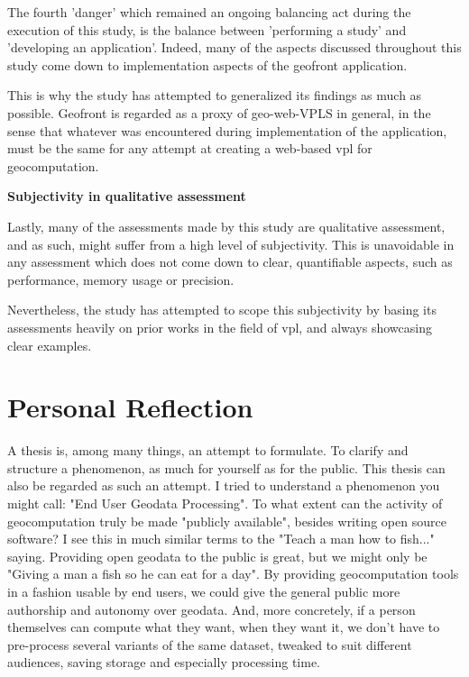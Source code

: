 The fourth 'danger' which remained an ongoing balancing act during the execution of this study, is the balance between 'performing a study' and 'developing an application'. 
Indeed, many of the aspects discussed throughout this study come down to implementation aspects of the geofront application. 

This is why the study has attempted to generalized its findings as much as possible.
Geofront is regarded as a proxy of geo-web-VPLS in general, in the sense that whatever was encountered during implementation of the application, must be the same for any attempt at creating a web-based vpl for geocomputation.


\textbf{Subjectivity in qualitative assessment}

Lastly, many of the assessments made by this study are qualitative assessment, and as such, might suffer from a high level of subjectivity. 
This is unavoidable in any assessment which does not come down to clear, quantifiable aspects, such as performance, memory usage or precision. 

Nevertheless, the study has attempted to scope this subjectivity by basing its assessments heavily on prior works in the field of vpl, and always showcasing clear examples. 

\newpage

\section{Personal Reflection}
\label{sec:personal-reflection}

A thesis is, among many things, an attempt to formulate. 
To clarify and structure a phenomenon, as much for yourself as for the public. 
This thesis can also be regarded as such an attempt. 
I tried to understand a phenomenon you might call: "End User Geodata Processing". 
To what extent can the activity of geocomputation truly be made "publicly available", besides writing open source software?
I see this in much similar terms to the "Teach a man how to fish..." saying.
Providing open geodata to the public is great, but we might only be "Giving a man a fish so he can eat for a day".
By providing geocomputation tools in a fashion usable by end users, we could give the general public more authorship and autonomy over geodata. 
And, more concretely, if a person themselves can compute what they want, when they want it, we don't have to pre-process several variants of the same dataset, tweaked to suit different audiences, saving storage and especially processing time.

